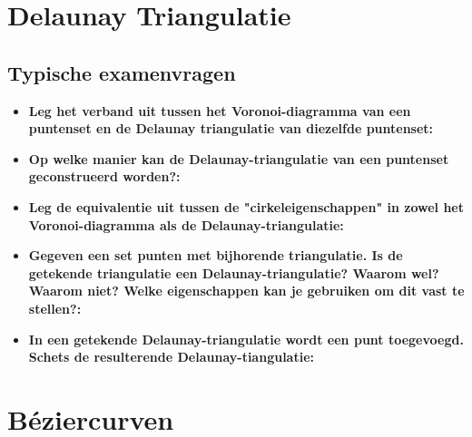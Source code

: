 \documentclass[12pt,a4paper]{article}
\begin{document}
	
	\section{Delaunay Triangulatie}
	\subsection{Typische examenvragen}
	\begin{itemize}
		\item \textbf{Leg het verband uit tussen het Voronoi-diagramma van een puntenset en de Delaunay triangulatie van diezelfde puntenset:}\\
		\item \textbf{Op welke manier kan de Delaunay-triangulatie van een puntenset geconstrueerd worden?:}\\
		\item \textbf{Leg de equivalentie uit tussen de "cirkeleigenschappen" in zowel het Voronoi-diagramma als de Delaunay-triangulatie:}\\
		\item \textbf{Gegeven een set punten met bijhorende triangulatie. Is de getekende triangulatie een Delaunay-triangulatie? Waarom wel? Waarom niet? Welke eigenschappen kan je gebruiken om dit vast te stellen?:}\\
		\item \textbf{In een getekende Delaunay-triangulatie wordt een punt toegevoegd. Schets de resulterende Delaunay-tiangulatie:}\\
	\end{itemize}
	
	
	\section{Béziercurven}
\end{document}
